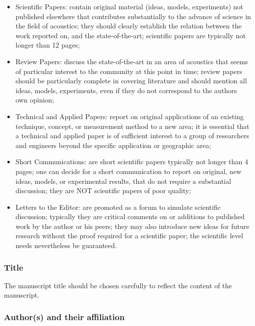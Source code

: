 \documentclass[twoside,twocolumn]{article}
\begin{document}
\begin{itemize}
\item Scientific Papers: contain original material (ideas, models,
   experiments) not published elsewhere that contributes substantially
   to the advance of science in the field of acoustics; they should
   clearly establish the relation between the work reported on, and the
   state-of-the-art; scientific papers are typically not longer than 12
   pages;
\item Review Papers: discuss the state-of-the-art in an area of
   acoustics that seems of particular interest to the community at this
   point in time; review papers should be particularly complete in
   covering literature and should mention all ideas, models,
   experiments, even if they do not correspond to the authors own
   opinion;
\item Technical and Applied Papers: report on original applications of
   an existing technique, concept, or measurement method to a new area;
   it is essential that a technical and applied paper is of sufficient
   interest to a group of researchers and engineers beyond the specific
   application or geographic area;
\item Short Communications: are short scientific papers typically not
   longer than 4 pages; one can decide for a short communication to
   report on original, new ideas, models, or experimental results, that
   do not require a substantial discussion; they are NOT scientific
   papers of poor quality;
\item Letters to the Editor: are promoted as a forum to simulate
   scientific discussion; typically they are critical comments on or
   additions to published work by the author or his peers; they may also
   introduce new ideas for future research without the proof required
   for a scientific paper; the scientific level needs nevertheless be
   guaranteed.
\end{itemize}

\subsubsection{Title}

The manuscript title should be chosen carefully to reflect the content
of the manuscript.

\subsubsection{Author(s) and their affiliation}
\end{document}
